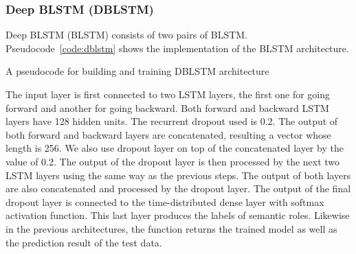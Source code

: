 \subsubsection{Deep BLSTM (DBLSTM)}
Deep BLSTM (BLSTM) consists of two pairs of BLSTM. Pseudocode~\ref{code:dblstm} shows the implementation of the BLSTM architecture.

\begin{kode}
	
	
	\caption{A pseudocode for building and training DBLSTM architecture}
	\label{code:dblstm}
\end{kode}

The input layer is first connected to two LSTM layers, the first one for going forward and another for going backward. Both forward and backward LSTM layers have 128 hidden units. The recurrent dropout used is 0.2. The output of both forward and backward layers are concatenated, resulting a vector whose length is 256. We also use dropout layer on top of the concatenated layer by the value of 0.2. The output of the dropout layer is then processed by the next two LSTM layers using the same way as the previous steps. The output of both layers are also concatenated and processed by the dropout layer. The output of the final dropout layer is connected to the time-distributed dense layer with softmax activation function. This last layer produces the labels of semantic roles. Likewise in the previous architectures, the function returns the trained model as well as the prediction result of the test data.

